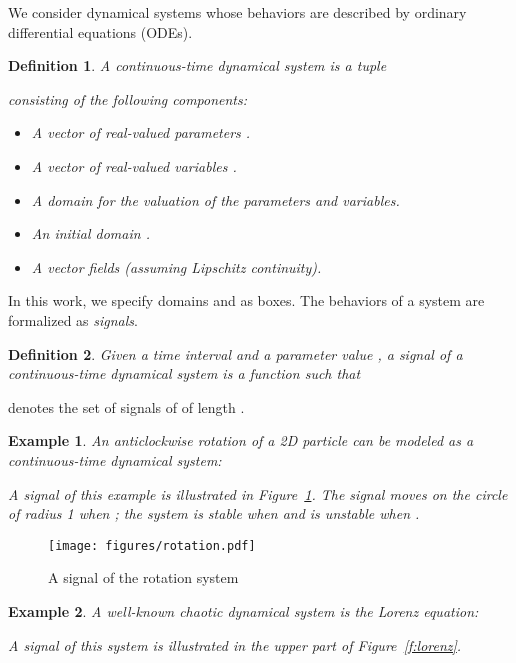 \documentclass[paper]{ieice}
\newtheorem{definition}{Definition}
\newtheorem{example}{Example}
\begin{document}
We consider dynamical systems whose behaviors are described by ordinary differential equations (ODEs).

\begin{definition}
A \emph{continuous-time dynamical system} is a tuple 

consisting of the following components:
\begin{itemize}
\item A vector of real-valued \emph{parameters} .
\item A vector of real-valued \emph{variables} .
\item A \emph{domain}  for the valuation of the parameters and variables.
\item An \emph{initial domain} .
\item A \emph{vector fields}  (assuming Lipschitz continuity).
\end{itemize}
\end{definition}
In this work, we specify domains  and  as boxes.
The behaviors of a system  are formalized as \emph{signals}.
\begin{definition}
	Given a time interval  and a parameter value ,
	a \emph{signal} of a continuous-time dynamical system  is a function  such that
    
\end{definition}
 denotes the set of signals of  of length .

\begin{example} \label{ex:rotation}
	An anticlockwise rotation of a 2D particle can be modeled as a continuous-time dynamical system:
	
A signal of this example is illustrated in Figure~\ref{f:rotation}.
The signal moves on the circle of radius 1 when ; the system is stable when  and is unstable when .
\end{example}

\begin{figure}[th]
\centering
\vspace{-1em}
\texttt{[image: figures/rotation.pdf]}
\caption{A signal of the rotation system}
\label{f:rotation}
\end{figure}

\begin{example} \label{ex:lorenz}
	A well-known chaotic dynamical system is the Lorenz equation:
	
A signal of this system is illustrated in the upper part of Figure~\ref{f:lorenz}.
\end{example}
\end{document}
